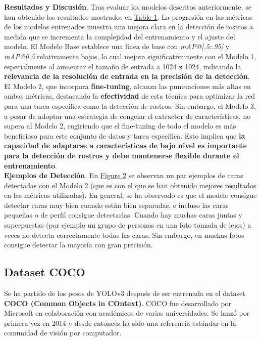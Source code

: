 \documentclass[10pt,twocolumn,letterpaper]{article}
\begin{document}
\textbf{Resultados y Discusión}. Tras evaluar los modelos descritos anteriormente, se han obtenido los resultados mostrados en \hyperref[tabla:resultados_evaluacion]{Table 1}. La progresión en las métricas de los modelos entrenados muestra una mejora clara en la detección de rostros a medida que se incrementa la complejidad del entrenamiento y el ajuste del modelo. El Modelo Base establece una línea de base con \textit{mAP@[.5:.95]} y \textit{mAP@0.5} relativamente bajos, lo cual mejora significativamente con el Modelo 1, especialmente al aumentar el tamaño de entrada a 1024 x 1024, indicando la \textbf{relevancia de la resolución de entrada en la precisión de la detección}.
El Modelo 2, que incorpora \textbf{fine-tuning}, alcanza las puntuaciones más altas en ambas métricas, destacando la \textbf{efectividad} de esta técnica para optimizar la red para una tarea específica como la detección de rostros. Sin embargo, el Modelo 3, a pesar de adoptar una estrategia de congelar el extractor de características, no supera al Modelo 2, sugiriendo que el fine-tuning de todo el modelo es más beneficioso para este conjunto de datos y tarea específica. Esto implica que \textbf{la capacidad de adaptarse a características de bajo nivel es importante para la detección de rostros y debe mantenerse flexible durante el entrenamiento}. \\

\textbf{Ejemplos de Detección}. En \hyperref[fig:fig2]{Figure 2} se observan un par ejemplos de caras detectadas con el Modelo 2 (que es con el que se han obtenido mejores resultados en las métricas utilizadas). En general, se ha observado es que el modelo consigue detectar caras muy bien cuando están bien separadas, e incluso las caras pequeñas o de perfil consigue detectarlas. Cuando hay muchas caras juntas y superpuestas (por ejemplo un grupo de personas en una foto tomada de lejos) a veces no detecta correctamente todas las caras. Sin embargo, en muchas fotos consigue detectar la mayoría con gran precisión.

\subsection{Dataset COCO}
\label{subsec:datasets}

Se ha partido de los pesos de YOLOv3 después de ser entrenada en el dataset \textbf{COCO (Common Objects in COntext)}. COCO fue desarrollado por Microsoft en colaboración con académicos de varias universidades. Se lanzó por primera vez en 2014 y desde entonces ha sido una referencia estándar 
en la comunidad de visión por computador.
\end{document}

